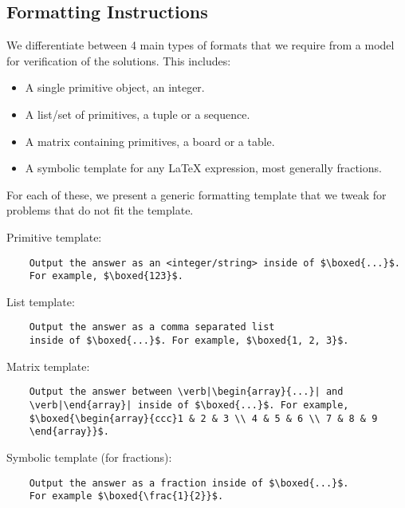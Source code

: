 \subsection{Formatting Instructions}
\label{app:exp:formatting}
We differentiate between 4 main types of formats that we require from a model for verification of the solutions. This includes:
\vspace{-3mm}
\begin{itemize}\setlength\itemsep{0.01em}
    \item A single primitive object, \ie an integer.
    \item A list/set of primitives, \ie a tuple or a sequence.
    \item A matrix containing primitives, \ie a board or a table.
    \item A symbolic template for any \LaTeX{} expression, most generally fractions.
\end{itemize}
For each of these, we present a generic formatting template that we tweak for problems that do not fit the template.

Primitive template: 
\vspace{-3mm}
    \begin{verbatim}
    Output the answer as an <integer/string> inside of $\boxed{...}$. 
    For example, $\boxed{123}$.
    \end{verbatim}

List template:
    \vspace{-3mm}
    \begin{verbatim}
    Output the answer as a comma separated list 
    inside of $\boxed{...}$. For example, $\boxed{1, 2, 3}$. 
\end{verbatim}
Matrix template: 
\vspace{-3mm}
    \begin{verbatim}
    Output the answer between \verb|\begin{array}{...}| and 
    \verb|\end{array}| inside of $\boxed{...}$. For example, 
    $\boxed{\begin{array}{ccc}1 & 2 & 3 \\ 4 & 5 & 6 \\ 7 & 8 & 9
    \end{array}}$.
    \end{verbatim}

Symbolic template (for fractions): 
\vspace{-3mm}
    \begin{verbatim}
    Output the answer as a fraction inside of $\boxed{...}$. 
    For example $\boxed{\frac{1}{2}}$.
    \end{verbatim}
